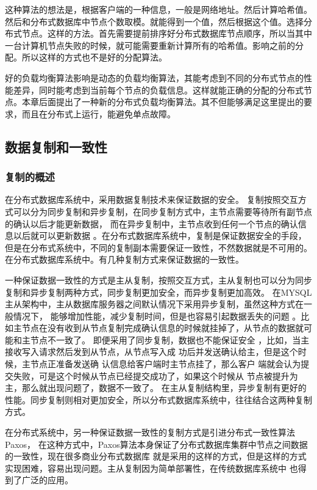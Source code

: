 	这种算法的想法是，根据客户端的一种信息，一般是网络地址。然后计算哈希值。然后和分布式数据库中节点个数取模。就能得到一个值，然后根据这个值。选择分布式节点。这样的方法。首先需要提前排序好分布式数据库节点顺序，所以当其中一台计算机节点失败的时候，就可能需要重新计算所有的哈希值。影响之前的分配。所以这样的方式也不是好的分配算法。
	
	好的负载均衡算法影响是动态的负载均衡算法，其能考虑到不同的分布式节点的性能差异，同时能考虑到当前每个节点的负载信息。这样就能正确的分配的分布式节点。本章后面提出了一种新的分布式负载均衡算法。其不但能够满足这里提出的要求，而且在分布式上运行，能避免单点故障。
\subsection{数据复制和一致性}
\subsubsection{复制的概述}
在分布式数据库系统中，采用数据复制技术来保证数据的安全。
复制按照交互方式可以分为同步复制和异步复制，在同步复制方式中，主节点需要等待所有副节点的确认以后才能更新数据，
而在异步复制中，主节点收到任何一个节点的确认信息以后就可以更新数据
。在分布式数据库系统中，复制是保证数据安全的手段，但是在分布式系统中，不同的复制副本需要保证一致性，不然数据就是不可用的。在分布式数据库系统中。有几种复制方式来保证数据的一致性。



一种保证数据一致性的方式是主从复制，按照交互方式，主从复制也可以分为同步复制和异步复制两种方式，同步复制更加安全，而异步复制更加高效。
在MYSQL主从架构中，主从数据库服务器之间默认情况下采用异步复制，虽然这种方式在一般情况下，
能够增加性能，减少复制时间，但是也容易引起数据丢失的问题
。比如主节点在没有收到从节点复制完成确认信息的时候就挂掉了，从节点的数据就可能和主节点不一致了。
即便采用了同步复制，数据也不能保证安全
，比如，当主接收写入请求然后发到从节点，从节点写入成
功后并发送确认给主，但是这个时候，主节点正准备发送确
认信息给客户端时主节点挂了，那么客户
端就会认为提交失败，可是这个时候从节点已经提交成功了，如果这个时候从
节点被提升为主，那么就出现问题了，数据不一致了。
在主从复制结构里，异步复制有更好的性能。同步复制则相对更加安全，所以分布式数据库系统中，往往结合这两种复制方式。

在分布式系统中，另一种保证数据一致性的复制方式是引进分布式一致性算法Paxos，
在这种方式中，Paxos算法本身保证了分布式数据库集群中节点之间数据的一致性，现在很多商业分布式数据库
就是采用的这样的方式，但是这样的方式实现困难，容易出现问题。主从复制因为简单部署性，在传统数据库系统中
也得到了广泛的应用。
